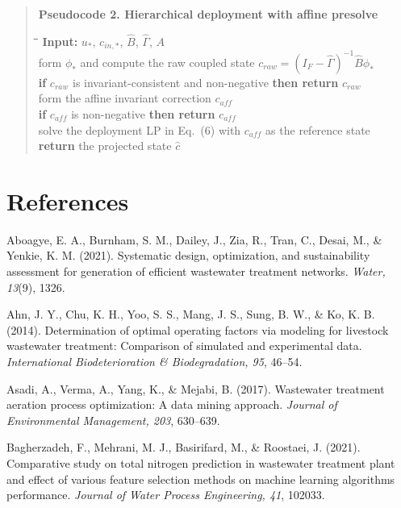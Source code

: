\documentclass[11pt]{article}
\begin{document}
\begin{quote}
\noindent\textbf{Pseudocode 2. Hierarchical deployment with affine presolve}
\begin{tabbing}
\hspace{0.6cm}\=\hspace{0.6cm}\=\hspace{0.6cm}\=\kill
\textbf{Input:} $u_*$, $c_{in,*}$, $\widehat{B}$, $\widehat{\Gamma}$, $A$ \\
form $\phi_*$ and compute the raw coupled state $c_{raw} = (I_F - \widehat{\Gamma})^{-1}\widehat{B}\phi_*$ \\
\textbf{if} $c_{raw}$ is invariant-consistent and non-negative \textbf{then return} $c_{raw}$ \\
form the affine invariant correction $c_{aff}$ \\
\textbf{if} $c_{aff}$ is non-negative \textbf{then return} $c_{aff}$ \\
solve the deployment LP in Eq.~(6) with $c_{aff}$ as the reference state \\
\textbf{return} the projected state $\hat{c}$
\end{tabbing}
\end{quote}

\section*{References}

\noindent Aboagye, E. A., Burnham, S. M., Dailey, J., Zia, R., Tran, C., Desai, M., \& Yenkie, K. M. (2021). Systematic design, optimization, and sustainability assessment for generation of efficient wastewater treatment networks. \textit{Water, 13}(9), 1326.

\noindent Ahn, J. Y., Chu, K. H., Yoo, S. S., Mang, J. S., Sung, B. W., \& Ko, K. B. (2014). Determination of optimal operating factors via modeling for livestock wastewater treatment: Comparison of simulated and experimental data. \textit{International Biodeterioration \& Biodegradation, 95}, 46--54.

\noindent Asadi, A., Verma, A., Yang, K., \& Mejabi, B. (2017). Wastewater treatment aeration process optimization: A data mining approach. \textit{Journal of Environmental Management, 203}, 630--639.

\noindent Bagherzadeh, F., Mehrani, M. J., Basirifard, M., \& Roostaei, J. (2021). Comparative study on total nitrogen prediction in wastewater treatment plant and effect of various feature selection methods on machine learning algorithms performance. \textit{Journal of Water Process Engineering, 41}, 102033.
\end{document}
